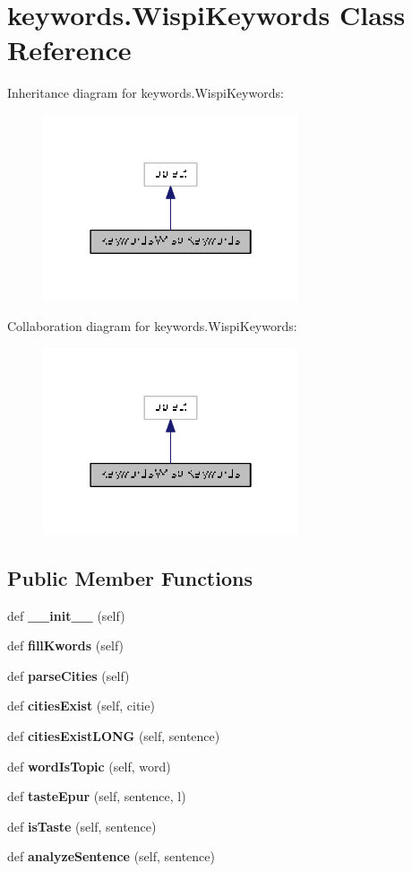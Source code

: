 \section{keywords.\+Wispi\+Keywords Class Reference}
\label{classkeywords_1_1_wispi_keywords}


Inheritance diagram for keywords.\+Wispi\+Keywords\+:
\nopagebreak
\begin{figure}[H]
\begin{center}
\leavevmode
\includegraphics[width=214pt]{classkeywords_1_1_wispi_keywords__inherit__graph}
\end{center}
\end{figure}


Collaboration diagram for keywords.\+Wispi\+Keywords\+:
\nopagebreak
\begin{figure}[H]
\begin{center}
\leavevmode
\includegraphics[width=214pt]{classkeywords_1_1_wispi_keywords__coll__graph}
\end{center}
\end{figure}
\subsection*{Public Member Functions}
\begin{DoxyCompactItemize}
\item 
def {\bf \+\_\+\+\_\+init\+\_\+\+\_\+} (self)
\item 
def {\bf fill\+Kwords} (self)
\item 
def {\bf parse\+Cities} (self)
\item 
def {\bf cities\+Exist} (self, citie)
\item 
def {\bf cities\+Exist\+L\+O\+NG} (self, sentence)
\item 
def {\bf word\+Is\+Topic} (self, word)
\item 
def {\bf taste\+Epur} (self, sentence, l)
\item 
def {\bf is\+Taste} (self, sentence)
\item 
def {\bf analyze\+Sentence} (self, sentence)
\end{DoxyCompactItemize}
